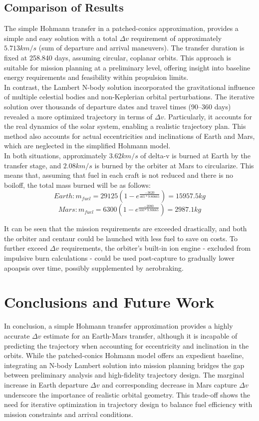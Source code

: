 \documentclass[conference]{IEEEtran}
\begin{document}
	\subsection{Comparison of Results}
	The simple Hohmann transfer in a patched-conics approximation, provides a simple and easy solution with a total $\Delta v$ requirement of approximately $5.713 km/s$ (sum of departure and arrival maneuvers). The transfer duration is fixed at 258.840 days, assuming circular, coplanar orbits. This approach is suitable for mission planning at a preliminary level, offering insight into baseline energy requirements and feasibility within propulsion limits.\\
	
	In contrast, the Lambert N-body solution incorporated the gravitational influence of multiple celestial bodies and non-Keplerian orbital perturbations. The iterative solution over thousands of departure dates and travel times (90–360 days) revealed a more optimized trajectory in terms of $\Delta v$. Particularly, it accounts for the real dynamics of the solar system, enabling a realistic trajectory plan. This method also accounts for actual eccentricities and inclinations of Earth and Mars, which are neglected in the simplified Hohmann model.\\
	
	In both situations, approximately $3.62km/s$ of delta-v is burned at Earth by the transfer stage, and $2.08km/s$ is burned by the orbiter at Mars to circularize.
	This means that, assuming that fuel in each craft is not reduced and there is no boiloff, the total mass burned will be as follows:
	\[
	Earth: m_{fuel} = 29125 (1 - e^{\frac{-3620}{465 * 9.80665}}) = 15957.5kg
	\]
	\[
	Mars: m_{fuel} = 6300 (1 - e^{\frac{-2080}{330 * 9.80665}}) = 2987.1kg
	\]
	
	It can be seen that the mission requirements are exceeded drastically, and both the orbiter and centaur could be launched with less fuel to save on costs. To further exceed $\Delta v$ requirements, the orbiter’s built-in ion engine - excluded from impulsive burn calculations - could be used post-capture to gradually lower apoapsis over time, possibly supplemented by aerobraking.
	
	\section{Conclusions and Future Work}
	
	In conclusion, a simple Hohmann transfer approximation provides a highly accurate $\Delta v$ estimate for an Earth-Mars transfer, although it is incapable of predicting the trajectory when accounting for eccentricity and inclination in the orbits. While the patched-conics Hohmann model offers an expedient baseline, integrating an N-body Lambert solution into mission planning bridges the gap between preliminary analysis and high-fidelity trajectory design. The marginal increase in Earth departure $\Delta v$ and corresponding decrease in Mars capture $\Delta v$ underscore the importance of realistic orbital geometry. This trade-off shows the need for iterative optimization in trajectory design to balance fuel efficiency with mission constraints and arrival conditions.
	
\end{document}
